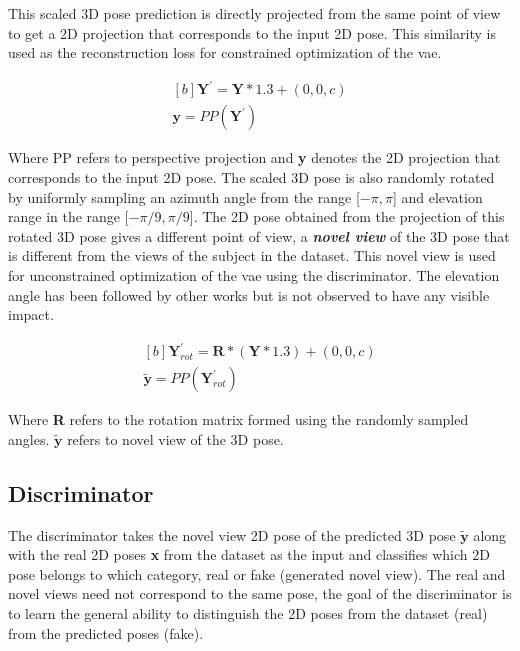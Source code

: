 This scaled 3D pose prediction is directly projected from the same point of view to get a 2D projection that corresponds to the input 2D pose. This similarity is used as the reconstruction loss for constrained optimization of the \ac{vae}.

\begin{equation} \label{eqn:proj_direct}
    \begin{gathered}[b]
        \textbf{Y}^\prime = \textbf{Y}*1.3 + (0,0,c) \\
        \textbf{y} = PP(\textbf{Y}^\prime)
    \end{gathered}
\end{equation}

Where PP refers to perspective projection and \textbf{y} denotes the 2D projection that corresponds to the input 2D pose. The scaled 3D pose is also randomly rotated by uniformly sampling an azimuth angle from the range [$-\pi, \pi$] and elevation range in the range [$-\pi/9, \pi/9$]. The 2D pose obtained from the projection of this rotated 3D pose gives a different point of view, a \textbf{\textit{novel view}} of the 3D pose that is different from the views of the subject in the dataset. This novel view is used for unconstrained optimization of the \ac{vae} using the discriminator. The elevation angle has been followed by other works but is not observed to have any visible impact.

\begin{equation} \label{eqn:proj_rotated}
    \begin{gathered}[b]
        \textbf{Y}^\prime_{rot} = \textbf{R} * (\textbf{Y}*1.3) + (0,0,c) \\
        \tilde{\textbf{y}} = PP(\textbf{Y}^\prime_{rot})
    \end{gathered}
\end{equation}

Where \textbf{R} refers to the rotation matrix formed using the randomly sampled angles. $\tilde{\textbf{y}}$ refers to novel view of the 3D pose.

\subsection{Discriminator}
The discriminator takes the novel view 2D pose of the predicted 3D pose $\tilde{\textbf{y}}$ along with the real 2D poses \textbf{x} from the dataset as the input and classifies which 2D pose belongs to which category, real or fake (generated novel view). The real and novel views need not correspond to the same pose, the goal of the discriminator is to learn the general ability to distinguish the 2D poses from the dataset (real) from the predicted poses (fake).


